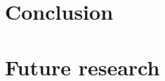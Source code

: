 \documentclass[12pt]{article}
\begin{document}

	
	\newpage
	\section{Conclusion} \label{sec:conclusion}
	
	\newpage
	\section{Future research} \label{sec:future_research}
	
\end{document}
